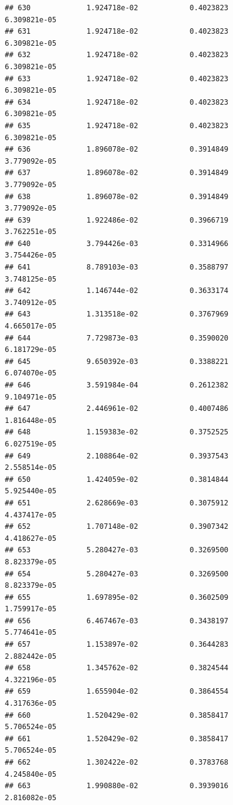 \documentclass[
]{article}
\begin{document}
\begin{verbatim}
## 630             1.924718e-02            0.4023823            6.309821e-05
## 631             1.924718e-02            0.4023823            6.309821e-05
## 632             1.924718e-02            0.4023823            6.309821e-05
## 633             1.924718e-02            0.4023823            6.309821e-05
## 634             1.924718e-02            0.4023823            6.309821e-05
## 635             1.924718e-02            0.4023823            6.309821e-05
## 636             1.896078e-02            0.3914849            3.779092e-05
## 637             1.896078e-02            0.3914849            3.779092e-05
## 638             1.896078e-02            0.3914849            3.779092e-05
## 639             1.922486e-02            0.3966719            3.762251e-05
## 640             3.794426e-03            0.3314966            3.754426e-05
## 641             8.789103e-03            0.3588797            3.748125e-05
## 642             1.146744e-02            0.3633174            3.740912e-05
## 643             1.313518e-02            0.3767969            4.665017e-05
## 644             7.729873e-03            0.3590020            6.181729e-05
## 645             9.650392e-03            0.3388221            6.074070e-05
## 646             3.591984e-04            0.2612382            9.104971e-05
## 647             2.446961e-02            0.4007486            1.816448e-05
## 648             1.159383e-02            0.3752525            6.027519e-05
## 649             2.108864e-02            0.3937543            2.558514e-05
## 650             1.424059e-02            0.3814844            5.925440e-05
## 651             2.628669e-03            0.3075912            4.437417e-05
## 652             1.707148e-02            0.3907342            4.418627e-05
## 653             5.280427e-03            0.3269500            8.823379e-05
## 654             5.280427e-03            0.3269500            8.823379e-05
## 655             1.697895e-02            0.3602509            1.759917e-05
## 656             6.467467e-03            0.3438197            5.774641e-05
## 657             1.153897e-02            0.3644283            2.882442e-05
## 658             1.345762e-02            0.3824544            4.322196e-05
## 659             1.655904e-02            0.3864554            4.317636e-05
## 660             1.520429e-02            0.3858417            5.706524e-05
## 661             1.520429e-02            0.3858417            5.706524e-05
## 662             1.302422e-02            0.3783768            4.245840e-05
## 663             1.990880e-02            0.3939016            2.816082e-05

\end{verbatim}
\end{document}
